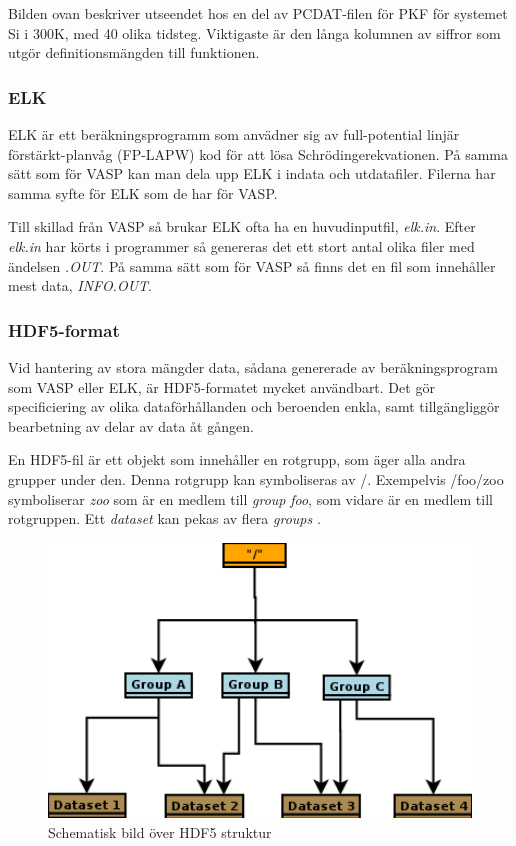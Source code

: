 \documentclass[10pt,oneside,swedish]{article}
\begin{document}
Bilden ovan beskriver utseendet hos en del av PCDAT-filen för PKF för
systemet Si i 300K, med 40 olika tidsteg. Viktigaste är den långa
kolumnen av siffror som utgör definitionsmängden till funktionen.

\subsubsection{ELK}
 ELK är ett beräkningsprogramm som anvädner sig av full-potential linjär förstärkt-planvåg (FP-LAPW) kod för att lösa Schrödingerekvationen. På samma sätt som för VASP kan man dela upp ELK i indata och utdatafiler. Filerna har samma syfte för ELK som de har för VASP.

Till skillad från VASP så brukar ELK ofta ha en huvudinputfil, \textit{elk.in}. Efter \textit{elk.in} har körts i programmer så genereras det ett stort antal olika filer med ändelsen \textit{.OUT}. På samma sätt som för VASP så finns det en fil som innehåller mest data, \textit{INFO.OUT}.


\subsubsection{HDF5-format}\label{hdf5-format}

Vid hantering av stora mängder data, sådana genererade av
beräkningsprogram som VASP eller ELK, är HDF5-formatet mycket användbart. Det gör
specificiering av olika dataförhållanden och beroenden enkla, samt
tillgängliggör bearbetning av delar av data åt gången.

En HDF5-fil är ett objekt som innehåller en rotgrupp, som äger alla
andra grupper under den. Denna rotgrupp kan symboliseras av /.
Exempelvis /foo/zoo symboliserar \emph{zoo} som är en medlem till
\emph{group} \emph{foo}, som vidare är en medlem till rotgruppen. Ett
\emph{dataset} kan pekas av flera \emph{groups} \cite{HDFGroup2}.

\begin{figure}[H]\label{}
\centering
\includegraphics[width=1.00000\textwidth]{Images/DemonstrativHDF5bild.png}
\caption{Schematisk bild över HDF5 struktur}
\end{figure}
\end{document}
